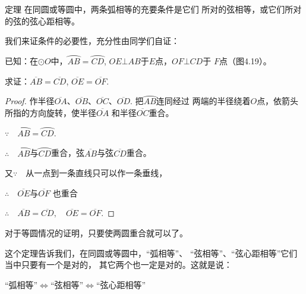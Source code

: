 \begin{blk}
    {定理} 在同圆或等圆中，两条弧相等的充要条件是它们
所对的弦相等，或它们所对的弦的弦心距相等。
\end{blk}

\begin{figure}[htp]
    \centering
    \caption{}
\end{figure}

我们来证条件的必要性，充分性由同学们自证：

已知：在$\odot O$中，$\wideparen{AB}=\wideparen{CD}$, 
$OE\bot  AB$于$E$点，$OF\bot CD$于
$F$点（图4.19）。

求证：$\overline{AB}=\overline{CD}$, $\overline{OE}=\overline{OF}$.

\begin{proof}
    作半径$\overline{OA}$、$\overline{OB}$、$\overline{OC}$、$\overline{OD}$. 把$\wideparen{AB}$连同经过
两端的半径绕着$O$点，依箭头所指的方向旋转，使半径$\overline{OA}$
和半径$\overline{OC}$重合。

$\because\quad \wideparen{AB}=\wideparen{CD}$.

$\therefore\quad \wideparen{AB}$与$\wideparen{CD}$重合，弦$\overline{AB}$与弦$\overline{CD}$重合。

又$\because\quad $从一点到一条直线只可以作一条垂线，

$\therefore\quad \overline{OE}$与$\overline{OF}$
也重合

$\therefore\quad \overline{AB}=\overline{CD},\quad \overline{OE}=\overline{OF}$.
\end{proof}

对于等圆情况的证明，只要使两圆重合就可以了。

这个定理告诉我们，在同圆或等圆中，“弧相等”、
“弦相等”、“弦心距相等”它们当中只要有一个是对的，
其它两个也一定是对的。这就是说：

\begin{blk}{}
   “弧相等”$\Longleftrightarrow$“弦相等”$\Longleftrightarrow$“弦心距相等” 
\end{blk}

